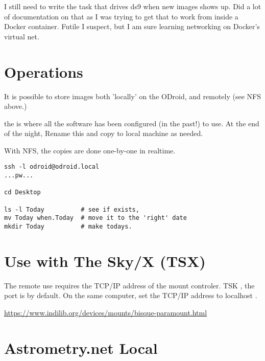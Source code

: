 \documentclass[letter,11pt,oneside]{article}
\newcommand{\dhl}[1]{{\color{verbcolor}{\texttt#1}}}
\begin{document}
I still need to write the task that drives ds9 when new images
shows up. Did a lot of documentation on that as I was trying
to get that to work from inside a Docker container. Futile
I suspect, but I am sure learning networking on Docker's virtual
net.


\section{Operations}

It is possible to store images both 'locally' on the ODroid,
and remotely (see NFS above.)

the \dhl{\~/Desktop/Today} is where all the software
has been configured (in the past!) to use. At the
end of the night, Rename this and copy to local
machine as needed.

With NFS, the copies are done one-by-one in realtime.


\begin{tcolorbox} %
\begingroup \fontsize{10pt}{10pt}
\selectfont
\begin{verbatim} 
ssh -l odroid@odroid.local
...pw...

cd Desktop

ls -l Today          # see if exists,
mv Today when.Today  # move it to the 'right' date
mkdir Today          # make todays.
\end{verbatim}
\endgroup
\end{tcolorbox}

\section{Use with The Sky/X (TSX)} \label{sec:skyx}

The remote use requires the TCP/IP address of the
mount controler. TSK \dhl{Tools->TCP Server}, the port is
\dhl{3040} by default. On the same computer, set the
TCP/IP address to localhost \dhl{127.0.0.1}.

\url{https://www.indilib.org/devices/mounts/bisque-paramount.html}

 



\section{Astrometry.net Local}  \label{sec:astrommetry}
\end{document}
